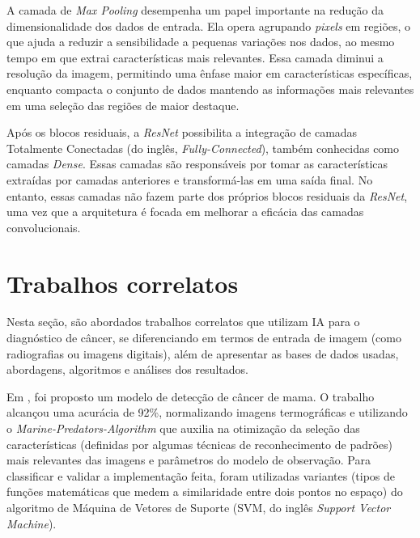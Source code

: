 A camada de \textit{Max Pooling} desempenha um papel importante na redução da dimensionalidade dos dados de entrada. Ela opera agrupando \textit{pixels} em regiões, o que ajuda a reduzir a sensibilidade a pequenas variações nos dados, ao mesmo tempo em que extrai características mais relevantes. Essa camada diminui a resolução da imagem, permitindo uma ênfase maior em características específicas, enquanto compacta o conjunto de dados mantendo as informações mais relevantes em uma seleção das regiões de maior destaque.


Após os blocos residuais, a \textit{ResNet} possibilita a integração de camadas Totalmente Conectadas (do inglês, \textit{Fully-Connected}), também conhecidas como camadas \textit{Dense}. Essas camadas são responsáveis por tomar as características extraídas por camadas anteriores e transformá-las em uma saída final. No entanto, essas camadas não fazem parte dos próprios blocos residuais da \textit{ResNet}, uma vez que a arquitetura é focada em melhorar a eficácia das camadas convolucionais.



\section{\esp Trabalhos correlatos} \label{trabcorr}

Nesta seção, são abordados trabalhos correlatos que utilizam IA para o diagnóstico de câncer, se diferenciando em termos de entrada de imagem (como radiografias ou imagens digitais), além de apresentar as bases de dados usadas, abordagens, algoritmos e análises dos resultados. 

Em , foi proposto um modelo de detecção de câncer de mama. O trabalho alcançou uma acurácia de 92\%, normalizando imagens termográficas e utilizando o \textit{Marine-Predators-Algorithm} que auxilia na otimização da seleção das características (definidas por algumas técnicas de reconhecimento de padrões) mais relevantes das imagens e parâmetros do modelo de observação. Para classificar e validar a implementação feita, foram utilizadas variantes (tipos de funções matemáticas que medem a similaridade entre dois pontos no espaço) do algoritmo de Máquina de Vetores de Suporte (SVM, do inglês \textit{Support Vector Machine}).

